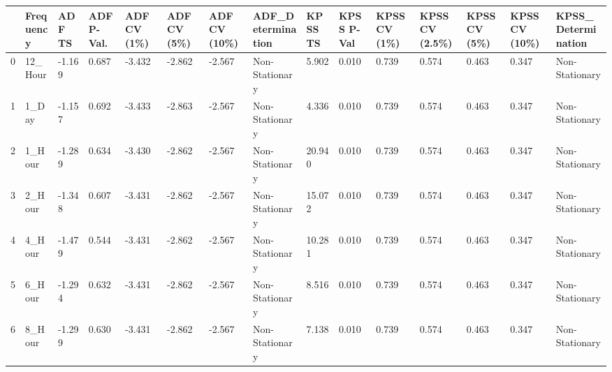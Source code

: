 \begin{tabular}{lllllllllllllll}
\toprule
 & Frequency & ADF TS & ADF P-Val. & ADF CV (1\%) & ADF CV (5\%) & ADF CV (10\%) & ADF_Determination & KPSS TS & KPSS P-Val & KPSS CV (1\%) & KPSS CV (2.5\%) & KPSS CV (5\%) & KPSS CV (10\%) & KPSS_Determination \\
\midrule
0 & 12_Hour & -1.169 & 0.687 & -3.432 & -2.862 & -2.567 & Non-Stationary & 5.902 & 0.010 & 0.739 & 0.574 & 0.463 & 0.347 & Non-Stationary \\
1 & 1_Day & -1.157 & 0.692 & -3.433 & -2.863 & -2.567 & Non-Stationary & 4.336 & 0.010 & 0.739 & 0.574 & 0.463 & 0.347 & Non-Stationary \\
2 & 1_Hour & -1.289 & 0.634 & -3.430 & -2.862 & -2.567 & Non-Stationary & 20.940 & 0.010 & 0.739 & 0.574 & 0.463 & 0.347 & Non-Stationary \\
3 & 2_Hour & -1.348 & 0.607 & -3.431 & -2.862 & -2.567 & Non-Stationary & 15.072 & 0.010 & 0.739 & 0.574 & 0.463 & 0.347 & Non-Stationary \\
4 & 4_Hour & -1.479 & 0.544 & -3.431 & -2.862 & -2.567 & Non-Stationary & 10.281 & 0.010 & 0.739 & 0.574 & 0.463 & 0.347 & Non-Stationary \\
5 & 6_Hour & -1.294 & 0.632 & -3.431 & -2.862 & -2.567 & Non-Stationary & 8.516 & 0.010 & 0.739 & 0.574 & 0.463 & 0.347 & Non-Stationary \\
6 & 8_Hour & -1.299 & 0.630 & -3.431 & -2.862 & -2.567 & Non-Stationary & 7.138 & 0.010 & 0.739 & 0.574 & 0.463 & 0.347 & Non-Stationary \\
\bottomrule
\end{tabular}
